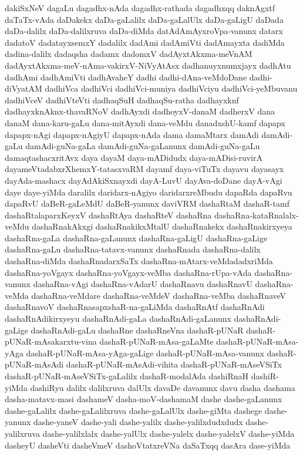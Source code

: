 {dakiSxNeV
dagaLu
dagadhx-nAda
dagadhx-rathada
dagadhxqq
daknAgxtf
daTaTx-vAda
daDakekx
daDa-gaLalilx
daDa-gaLalUlx
daDa-gaLigU
daDada
daDa-dalilx
daDa-dalilxruva
daDa-diMda
datAdAmAyxroVpa-vanunx
datarx
dadatoV
dadatayxsemxY
dadalilx
dadAmi
dadAmiVti
dadAmayxta
dadiMda
dadina-dalilx
dadaqsha
dadamx
dadomxV
dadAyxtAkxma-meVnAM
dadAyxtAkxma-meV-nAma-vakirxV-NiVyAtAsx
dadhanuyxnumxjayx
dadhAtu
dadhAmi
dadhAmiVti
dadhAvaheY
dadhi
dadhi-dAna-veMdoDane
dadhi-diVyatAM
dadhiVca
dadhiVci
dadhiVci-muniya
dadhiVciyu
dadhiVci-yeMbuvanu
dadhiVceV
dadhiVteVti
dadhaqSuH
dadhaqSu-ratha
dadhayxknf
dadhayxknAknx-thavaRNoV
dadhAyxdi
dadhoyxV-danaM
dadherxV
dana
danaM
dana-karu-gaLu
dana-mitAyxdi
dana-veMdu
danadxshU-kamf
dapapx
dapapx-nAgi
dapapx-nAgiyU
dapapx-nAda
dama
damaMtarx
damAdi
damAdi-gaLu
damAdi-guNa-gaLa
damAdi-guNa-gaLanunx
damAdi-guNa-gaLu
damaqtashacxritAvx
daya
dayaM
daya-mADidudx
daya-mADisi-ruvirA
dayameVtadabxrXhemxY-tatasxvaRM
dayamf
daya-viTuTx
dayavu
dayasayx
dayAda-mashacx
dayAdAkiSxnayxdi
dayA-LuvU
dayAva-doDane
dayA-vAgi
daye
daye-yiMda
daralilx
daridarx-nAgiyo
daridarxreMbudu
dapaRda
dapaRvu
dapaRvU
daBeR-gaLeMdU
daBeR-yanunx
daviVRM
dashaRtaM
dashaR-tamf
dashaRtalaparxKeyxV
dashaRtAya
dashaRteV
dashaRna
dashaRna-kataRnalalx-veMdu
dashaRnakAkxgi
dashaRnakikxMtalU
dashaRnakekx
dashaRnakirxyeya
dashaRna-gaLa
dashaRna-gaLanunx
dashaRna-gaLigU
dashaRna-gaLige
dashaRna-gaLu
dashaRna-tatavx-vanunx
dashaRnada
dashaRna-dalilx
dashaRna-diMda
dashaRnadarxSaTx
dashaRna-mAtarx-veMdadadxriMda
dashaRna-yoVgayx
dashaRna-yoVgayx-veMba
dashaRna-rUpa-vAda
dashaRna-vanunx
dashaRna-vAgi
dashaRna-vAdarU
dashaRnavu
dashaRnavU
dashaRna-veMda
dashaRna-veMdare
dashaRna-veMdeV
dashaRna-veMba
dashaRnaveV
dashaRnavoV
dashaRnasapxshaR-na-gaLiMda
dashaRnAtf
dashaRnAdi
dashaRnAdikirxyeyu
dashaRnAdi-gaLa
dashaRnAdi-gaLanunx
dashaRnAdi-gaLige
dashaRnAdi-gaLu
dashaRne
dashaRneVna
dashaR-pUNaR
dashaR-pUNaR-mAsakarxtu-vina
dashaR-pUNaR-mAsa-gaLaMte
dashaR-pUNaR-mAsa-yAga
dashaR-pUNaR-mAsa-yAga-gaLige
dashaR-pUNaR-mAsa-vanunx
dashaR-pUNaR-mAsAdi
dashaR-pUNaR-mAsAdi-vihita
dashaR-pUNaR-mAseVSiTx
dashaR-pUNaR-mAseVSiTx-gaLalilx
dashaR-modalAda
dashiRnaH
dashiR-yiMda
dashiRyu
dalilx
dalilxruva
dalUlx
davaDe
davanunx
davu
dasha
dashama
dasha-matavx-masi
dashameV
dasha-moV-dashamaM
dashe
dashe-gaLanunx
dashe-gaLalilx
dashe-gaLalilxruva
dashe-gaLalUlx
dashe-giMta
dashege
dashe-yanunx
dashe-yaneV
dashe-yali
dashe-yalilx
dashe-yalilxdudxdudx
dashe-yalilxruva
dashe-yalilxlalx
dashe-yalUlx
dashe-yalelx
dashe-yalelxV
dashe-yiMda
dasheyU
dasheVti
dasheVmeV
dashoVtatxreVNa
daSaTxqq
dasAra
dase-yiMda
}
